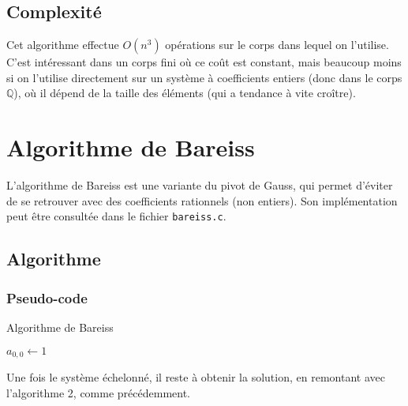 \documentclass[french]{article}
\begin{document}
\subsection{Complexité}
Cet algorithme effectue $O(n^3)$ opérations sur le corps dans lequel on l'utilise. C'est intéressant dans un corps fini où ce coût est constant, mais beaucoup moins si on l'utilise directement sur un système à coefficients entiers (donc dans le corps $\mathbb{Q}$), où il dépend de la taille des éléments (qui a tendance à vite croître).
\section{Algorithme de Bareiss} \label{sec:bareiss}
L'algorithme de Bareiss est une variante du pivot de Gauss, qui permet d'éviter de se retrouver avec des coefficients rationnels (non entiers). Son implémentation peut être consultée dans le fichier {\tt bareiss.c}.
\subsection{Algorithme}
\subsubsection{Pseudo-code}
\begin{algorithm}[H]
	\DontPrintSemicolon
	\caption{Algorithme de Bareiss}
	$a_{0,0} \gets 1$
\end{algorithm}
\leavevmode \newline
Une fois le système échelonné, il reste à obtenir la solution, en remontant avec l'algorithme 2, comme précédemment.
\end{document}
